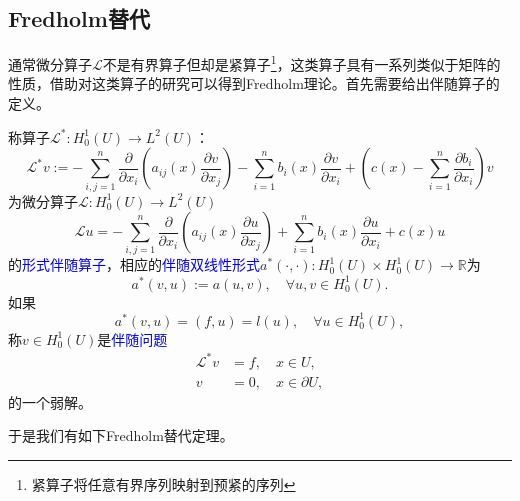 \documentclass[a4paper,10pt]{ctexart}
\begin{document}
\subsection{Fredholm替代}
通常微分算子$ \mathcal{L} $不是有界算子但却是紧算子\footnote{紧算子将任意有界序列映射到预紧的序列}，这类算子具有一系列类似于矩阵的性质，借助对这类算子的研究可以得到Fredholm理论。首先需要给出伴随算子的定义。
\begin{definition}
    称算子$ \mathcal{L}^*:H^1_0(U)\to L^2(U) $：
    \begin{equation}
        \mathcal{L}^*v := -\sum_{i,j=1}^n \dfrac{\partial}{\partial x_i} \left( a_{ij}(x) \dfrac{\partial v}{\partial x_j} \right) - \sum_{i=1}^n b_i(x) \dfrac{\partial v}{\partial x_i} + \left( c(x)-\sum_{i=1}^n \dfrac{\partial b_i}{\partial x_i}  \right) v
    \end{equation}
    为微分算子$ \mathcal{L}:H^1_0(U)\to L^2(U) $
    \[
        \mathcal{L}u = -\sum_{i,j=1}^n \dfrac{\partial}{\partial x_i} \left( a_{ij}(x) \dfrac{\partial u}{\partial x_j} \right) + \sum_{i=1}^n b_i(x) \dfrac{\partial u}{\partial x_i} + c(x)u
    \]
    的\textcolor{blue}{形式伴随算子}，相应的\textcolor{blue}{伴随双线性形式}$ a^*(\cdot,\cdot):H^1_0(U)\times H^1_0(U)\to \mathbb{R} $为
    \begin{equation}
        a^*(v,u) := a(u,v),\quad \forall u,v\in H^1_0(U).
    \end{equation}
    如果
    \begin{equation}
        a^*(v,u) = (f,u) = l(u),\quad \forall u\in H^1_0(U),
    \end{equation}
    称$ v\in H^1_0(U) $是\textcolor{blue}{伴随问题}
    \begin{equation}
        \begin{aligned}
            \mathcal{L}^*v &= f, \quad x\in U,\\
            v &= 0, \quad x\in \partial U,
        \end{aligned}
    \end{equation}
    的一个弱解。
\end{definition}
于是我们有如下Fredholm替代定理。
\end{document}
